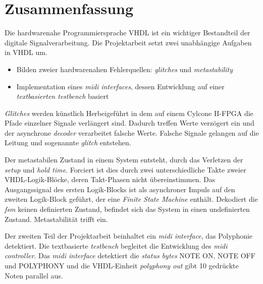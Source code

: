 
\chapter*{Zusammenfassung}


Die hardwarenahe Programmiersprache VHDL ist ein wichtiger Bestandteil der digitale Signalverarbeitung. Die Projektarbeit setzt zwei unabhängige Aufgaben in VHDL um.

\begin{itemize}
\item Bilden zweier hardwarenahen Fehlerquellen: \textit{glitches} und \textit{metastability}
	\item Implementation eines \textit{midi interfaces}, dessen Entwicklung auf einer \textit{textbasierten testbench} basiert
\end{itemize} 

 \textit{Glitches} werden künstlich Herbeigeführt in dem auf einem Cylcone II-FPGA die Pfade einzelner Signale verlängert sind. Dadurch treffen Werte verzögert ein und der asynchrone \textit{decoder} verarbeitet falsche Werte. Falsche Signale gelangen auf die Leitung und sogenannte \textit{glitch} entstehen. 

Der metastabilen Zustand in einem System entsteht, durch das Verletzen der \textit{setup} und \textit{hold time}. Forciert ist dies durch zwei unterschiedliche Takte zweier VHDL-Logik-Blöcke, deren Takt-Phasen nicht übereinstimmen. Das Ausgangssignal des ersten Logik-Blocks ist als asynchroner Impuls auf den zweiten Logik-Block geführt, der eine \textit{Finite State Machine} enthält. Dekodiert die \textit{fsm} keinen definierten Zustand, befindet sich das System in einen undefinierten Zustand. Metastabilität trifft ein.

Der zweiten Teil der Projektarbeit beinhaltet ein \textit{midi interface}, das Polyphonie detektiert. Die textbasierte \textit{testbench} begleitet die Entwicklung des \textit{midi controller}. Das \textit{midi interface} detektiert die \textit{status bytes} NOTE ON, NOTE OFF und POLYPHONY und die VHDL-Einheit \textit{polyphony out} gibt 10 gedrückte Noten parallel aus.
